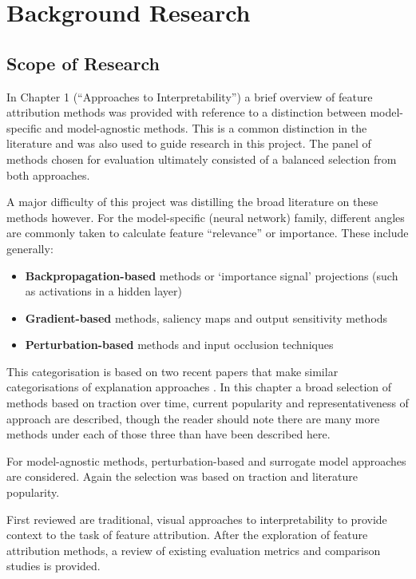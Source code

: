 \documentclass[main]{subfiles}
\begin{document}
\chapter{Background Research}

\section{Scope of Research} \label{sec:scoperesearch}

In Chapter 1 (``Approaches to Interpretability'') a brief overview of feature attribution methods was provided with reference to a distinction between model-specific and model-agnostic methods. This is a common distinction in the literature and was also used to guide research in this project. The panel of methods chosen for evaluation ultimately consisted of a balanced selection from both approaches. 

A major difficulty of this project was distilling the broad literature on these methods however. For the model-specific (neural network) family, different angles are commonly taken to calculate feature ``relevance'' or importance. These include generally:
\begin{itemize}
\item \textbf{Backpropagation-based} methods or `importance signal' projections (such as activations in a hidden layer)
\item \textbf{Gradient-based} methods, saliency maps and output sensitivity methods
\item \textbf{Perturbation-based} methods and input occlusion techniques
\end{itemize}

This categorisation is based on two recent papers that make similar categorisations of explanation approaches  \cite{deeplift} \cite{patternnet}. In this chapter a broad selection of methods based on traction over time, current popularity and representativeness of approach are described, though the reader should note there are many more methods under each of those three than have been described here.

For model-agnostic methods, perturbation-based and surrogate model approaches are considered. Again the selection was based on traction and literature popularity.

First reviewed are traditional, visual approaches to interpretability to provide context to the task of feature attribution. After the exploration of feature attribution methods, a review of existing evaluation metrics and comparison studies is provided.
\end{document}

